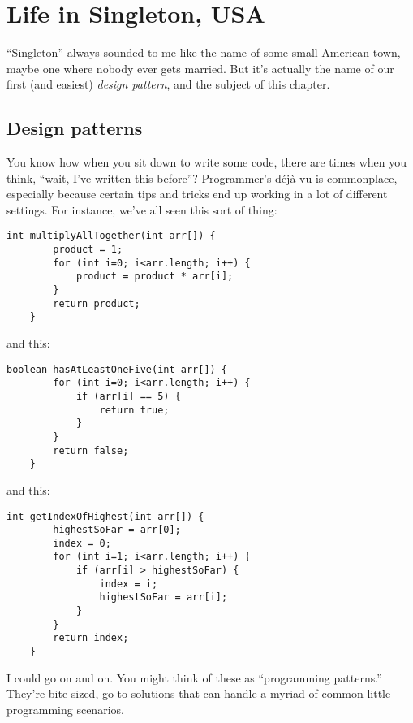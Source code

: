 
\chapter{Life in Singleton, USA}

``Singleton'' always sounded to me like the name of some small American town,
maybe one where nobody ever gets married. But it's actually the name of our
first (and easiest) \textit{design pattern}, and the subject of this chapter.

\section{Design patterns}

You know how when you sit down to write some code, there are times when you
think, ``wait, I've written this before''? Programmer's d\'{e}j\`{a} vu is
commonplace, especially because certain tips and tricks end up working in
a lot of different settings. For instance, we've all seen this sort of thing:

\vspace{-.1in}
\begin{Verbatim}[fontsize=\small]
    int multiplyAllTogether(int arr[]) {
        product = 1;
        for (int i=0; i<arr.length; i++) {
            product = product * arr[i];
        }
        return product;
    }
\end{Verbatim}

and this:

\pagebreak
\begin{Verbatim}[fontsize=\small]
    boolean hasAtLeastOneFive(int arr[]) {
        for (int i=0; i<arr.length; i++) {
            if (arr[i] == 5) {
                return true;
            }
        }
        return false;
    }
\end{Verbatim}

and this:

\begin{samepage}
\begin{Verbatim}[fontsize=\small]
    int getIndexOfHighest(int arr[]) {
        highestSoFar = arr[0];
        index = 0;
        for (int i=1; i<arr.length; i++) {
            if (arr[i] > highestSoFar) {
                index = i;
                highestSoFar = arr[i];
            }
        }
        return index;
    }
\end{Verbatim}
\end{samepage}

I could go on and on. You might think of these as ``programming patterns.''
They're bite-sized, go-to solutions that can handle a myriad of common little
programming scenarios.

